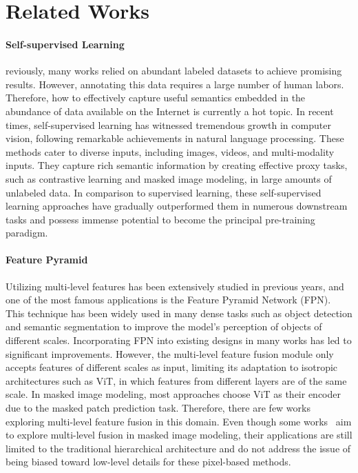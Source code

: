 \section{Related Works}

\paragraph{Self-supervised Learning} reviously, many works\cite{ViT, DeiT} relied on abundant labeled datasets to achieve promising results. However, annotating this data requires a large number of human labors. Therefore, how to effectively capture useful semantics embedded in the abundance of data available on the Internet is currently a hot topic.
In recent times, self-supervised learning has witnessed tremendous growth in computer vision, following remarkable achievements in natural language processing. These methods cater to diverse inputs, including images\cite{simclr,BEiT,MAE,ibot}, videos\cite{2022MoQuad,hu2021contrast}, and multi-modality inputs\cite{CLIP,2021LearningTBP}. They capture rich semantic information by creating effective proxy tasks, such as contrastive learning and masked image modeling, in large amounts of unlabeled data. In comparison to supervised learning\cite{DeiT,DeiT-v2,DEiT-v3}, these self-supervised learning approaches have gradually outperformed them in numerous downstream tasks and possess immense potential to become the principal pre-training paradigm.

\paragraph{Feature Pyramid} Utilizing multi-level features has been extensively studied in previous years, and one of the most famous applications is the Feature Pyramid Network (FPN)\cite{FPN}. This technique has been widely used in many dense tasks such as object detection and semantic segmentation to improve the model's perception of objects of different scales. Incorporating FPN into existing designs in many works\cite{maskrcnn, upernet} has led to significant improvements. However, the multi-level feature fusion module only accepts features of different scales as input, limiting its adaptation to isotropic architectures such as ViT\cite{ViT}, in which features from different layers are of the same scale. In masked image modeling, most approaches choose ViT as their encoder due to the masked patch prediction task. Therefore, there are few works exploring multi-level feature fusion in this domain. Even though some works~\cite{ConvMAE,itpn} aim to explore multi-level fusion in masked image modeling, their applications are still limited to the traditional hierarchical architecture and do not address the issue of being biased toward low-level details for these pixel-based methods.
